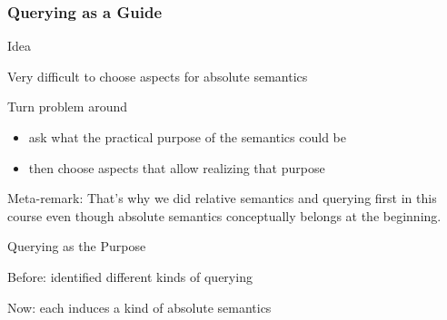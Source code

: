 \begin{frame}\frametitle{Querying as a Guide}
\begin{blockitems}{Idea}
\item Very difficult to choose aspects for absolute semantics
\item Turn problem around
 \begin{itemize}
 \item ask what the practical purpose of the semantics could be
 \item then choose aspects that allow realizing that purpose
 \end{itemize}
\end{blockitems}

Meta-remark: That's why we did relative semantics and querying first in this course even though absolute semantics conceptually belongs at the beginning.

\begin{blockitems}{Querying as the Purpose}
\item Before: identified different kinds of querying
\item Now: each induces a kind of absolute semantics
\end{blockitems}
\end{frame}

%

